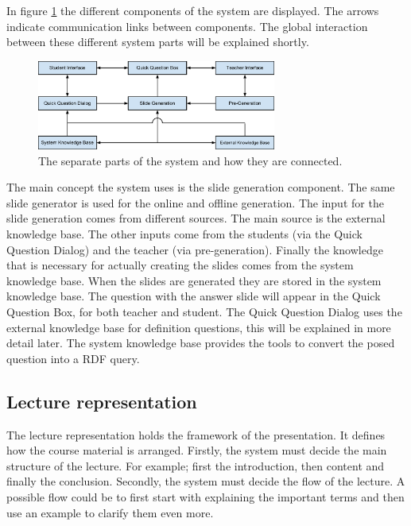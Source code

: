 \documentclass[11pt]{article}
\begin{document}
In figure \ref{systemOverview} the different components of the system are displayed. The arrows indicate communication links between components. The global interaction between these different system parts will be explained shortly. 

\begin{figure}[!h]
\centering
\includegraphics[width=0.7\textwidth]{systemOverview.pdf}
\caption{The separate parts of the system and how they are connected.}
\label{systemOverview}
\end{figure}

The main concept the system uses is the slide generation component. The same slide generator is used for the online and offline generation. The input for the slide generation comes from different sources. The main source is the external knowledge base. The other inputs come from the students (via the Quick Question Dialog) and the teacher (via pre-generation). Finally the knowledge that is necessary for actually creating the slides comes from the system knowledge base.
When the slides are generated they are stored in the system knowledge base. The question with the answer slide will appear in the Quick Question Box, for both teacher and student.
The Quick Question Dialog uses the external knowledge base for definition questions, this will be explained in more detail later. The system knowledge base provides the tools to convert the posed question into a RDF query.


\subsection{Lecture representation}
The lecture representation holds the framework of the presentation. It defines how the course material is arranged. Firstly, the system must decide the main structure of the lecture. For example; first the introduction, then content and finally the conclusion. Secondly, the system must decide the flow of the lecture. A possible flow could be to first start with explaining the important terms and then use an example to clarify them even more.
\end{document}
